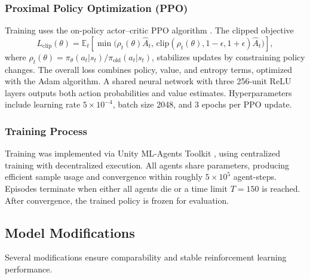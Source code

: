 \documentclass[pdflatex,sn-mathphys-num]{sn-jnl}%
\theoremstyle{thmstyleone}%
\theoremstyle{thmstyletwo}%
\theoremstyle{thmstylethree}%
\begin{document}
\subsubsection{Proximal Policy Optimization (PPO)}
Training uses the on-policy actor–critic PPO algorithm \citep{Schulman2017}.  
The clipped objective
\[
L_{\text{clip}}(\theta)=\mathbb{E}_t\!\left[\min\!\big(\rho_t(\theta)\hat{A}_t,
\,\text{clip}(\rho_t(\theta),1-\epsilon,1+\epsilon)\hat{A}_t\big)\right],
\]
where \(\rho_t(\theta)=\pi_\theta(a_t|s_t)/\pi_{\text{old}}(a_t|s_t)\), stabilizes updates by constraining policy changes.  
The overall loss combines policy, value, and entropy terms, optimized with the Adam algorithm.  
A shared neural network with three 256-unit ReLU layers outputs both action probabilities and value estimates.  
Hyperparameters include learning rate \(5\times10^{-4}\), batch size 2048, and 3 epochs per PPO update.

\subsubsection{Training Process}
Training was implemented via Unity ML-Agents Toolkit \citep{Unity2025}, using centralized training with decentralized execution.  
All agents share parameters, producing efficient sample usage and convergence within roughly \(5\times10^5\) agent-steps.  
Episodes terminate when either all agents die or a time limit \(T=150\) is reached.  
After convergence, the trained policy is frozen for evaluation.

\subsection{Model Modifications}

Several modifications ensure comparability and stable reinforcement learning performance.
\end{document}

